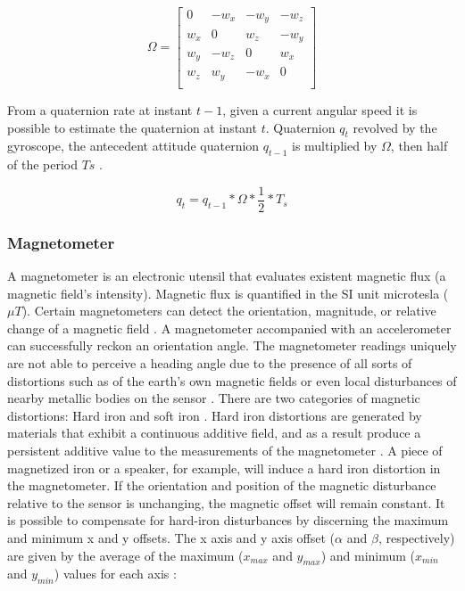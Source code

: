 \begin{equation}
    \Omega = \begin{bmatrix}
        0   & -w_x & -w_y & -w_z \\
        w_x & 0    & w_z  & -w_y \\
        w_y & -w_z & 0    & w_x  \\
        w_z & w_y  & -w_x & 0    \\
    \end{bmatrix}
\end{equation}

From a quaternion rate at instant $t-1$, given a current angular speed it is possible to estimate the quaternion at instant $t$. Quaternion $q_t$ revolved by the gyroscope, the antecedent attitude quaternion $q_{t-1}$ is multiplied by $\Omega$, then half of the period $Ts$ \cite{trusov2011overview}.

\begin{equation}
    q_t = q_{t-1} \ast \Omega \ast \frac{1}{2} \ast T_s
\end{equation}

\subsubsection{Magnetometer}

A magnetometer is an electronic utensil that evaluates existent magnetic flux (a magnetic field's intensity). Magnetic flux is quantified in the SI unit microtesla ($\mu T$). Certain magnetometers can detect the orientation, magnitude, or relative change of a magnetic field \cite{caruso1998new}. A magnetometer accompanied with an accelerometer can successfully reckon an orientation angle. The magnetometer readings uniquely are not able to perceive a heading angle due to the presence of all sorts of distortions such as of the earth's own magnetic fields or even local disturbances of nearby metallic bodies on the sensor \cite{silva2021error} \cite{caruso1998new}. There are two categories of magnetic distortions: Hard iron and soft iron \cite{wahdan2014magnetometer}. Hard iron distortions are generated by materials that exhibit a continuous additive field, and as a result produce a persistent additive value to the measurements of the magnetometer \cite{guo2008soft}. A piece of magnetized iron or a speaker, for example, will induce a hard iron distortion in the magnetometer. If the orientation and position of the magnetic disturbance relative to the sensor is unchanging, the magnetic offset will remain constant. It is possible to compensate for hard-iron disturbances by discerning the maximum and minimum x and y offsets. The x axis and y axis offset ($\alpha$ and $\beta$, respectively) are given by the average of the maximum ($x_{max}$ and $y_{max}$) and minimum ($x_{min}$ and $y_{min}$) values for each axis \cite{daponte2017method}:

